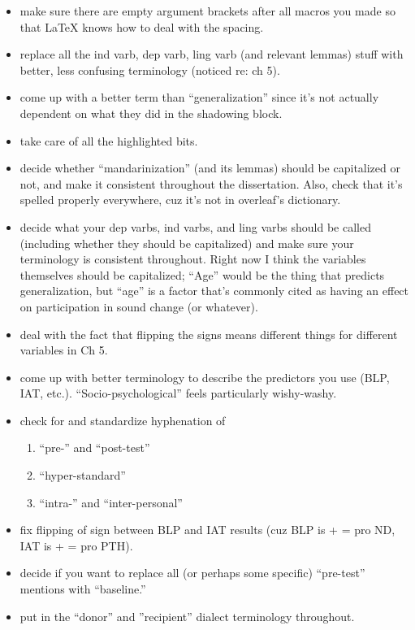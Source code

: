 \begin{itemize}
    \item make sure there are empty argument brackets after all macros you made so that \LaTeX{} knows how to deal with the spacing.
    \item replace all the ind varb, dep varb, ling varb (and relevant lemmas) stuff with better, less confusing terminology (noticed re: ch 5).
    \item come up with a better term than ``generalization'' since it's not actually dependent on what they did in the shadowing block.
    \item take care of all the highlighted bits.
    \item decide whether ``mandarinization'' (and its lemmas) should be capitalized or not, and make it consistent throughout the dissertation. Also, check that it's spelled properly everywhere, cuz it's not in overleaf's dictionary.
    \item decide what your dep varbs, ind varbs, and ling varbs should be called (including whether they should be capitalized) and make sure your terminology is consistent throughout. Right now I think the variables themselves should be capitalized; ``Age'' would be the thing that predicts generalization, but ``age'' is a factor that's commonly cited as having an effect on participation in sound change (or whatever).
    \item deal with the fact that flipping the signs means different things for different variables in Ch 5.
    \item come up with better terminology to describe the predictors you use (BLP, IAT, etc.). ``Socio-psychological'' feels particularly wishy-washy.
    \item check for and standardize hyphenation of \begin{enumerate}
        \item ``pre-'' and ``post-test''
        \item ``hyper-standard''
        \item ``intra-'' and ``inter-personal''
    \end{enumerate}
    \item fix flipping of sign between BLP and IAT results (cuz BLP is + = pro ND, IAT is + = pro PTH).
    \item decide if you want to replace all (or perhaps some specific) ``pre-test'' mentions with ``baseline.''
    \item put in the ``donor'' and ''recipient'' dialect terminology throughout.

\end{itemize}
